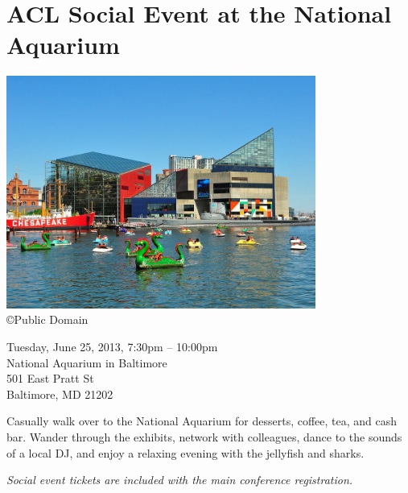 \clearpage
\section[Social Event at the National Aquarium]{ACL Social Event at the National Aquarium}

\begin{center}

\includegraphics[width=4in]{content/tuesday/aqua.jpg} \\

{\tiny \copyright Public Domain}

Tuesday, June 25, 2013, 7:30pm -- 10:00pm \vspace{1em}\\
National Aquarium in Baltimore\\
501 East Pratt St\\
Baltimore, MD 21202
\end{center}

\noindent Casually walk over to the National Aquarium for desserts,
coffee, tea, and cash bar. Wander through the exhibits, network with
colleagues, dance to the sounds of a local DJ, and enjoy a relaxing
evening with the jellyfish and sharks.

\noindent \emph{Social event tickets are included with the main
  conference registration.}

